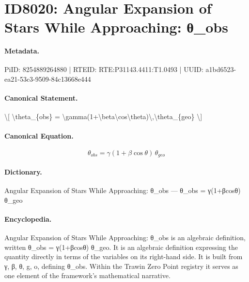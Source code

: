 \section*{ID8020: Angular Expansion of Stars While Approaching: θ\_obs}
\paragraph{Metadata.}
PiID: 8254889264880 | RTEID: RTE:P31143.4411:T1.0493 | UUID: a1bd6523-ea21-53c3-9509-84c13668e444

\paragraph{Canonical Statement.}
\textbackslash{}[ \textbackslash{}theta\_\{obs\} = \textbackslash{}gamma(1+\textbackslash{}beta\textbackslash{}cos\textbackslash{}theta)\textbackslash{},\textbackslash{}theta\_\{geo\} \textbackslash{}]

\paragraph{Canonical Equation.}
\[
\theta_{obs} = \gamma(1+\beta\cos\theta)\,\theta_{geo}
\]

\paragraph{Dictionary.}
Angular Expansion of Stars While Approaching: θ\_obs — θ\_obs = γ(1+βcosθ) θ\_geo

\paragraph{Encyclopedia.}
Angular Expansion of Stars While Approaching: θ\_obs is an algebraic definition, written θ\_obs = γ(1+βcosθ) θ\_geo. It is an algebraic definition expressing the quantity directly in terms of the variables on its right-hand side. It is built from γ, β, θ, g, o, defining θ\_obs. Within the Trawin Zero Point registry it serves as one element of the framework's mathematical narrative.
